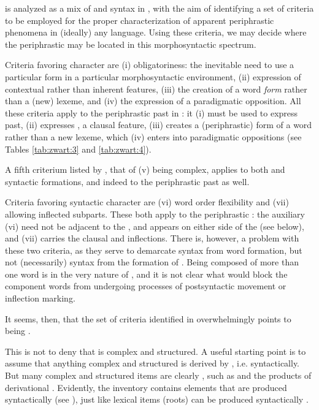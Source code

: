 \documentclass[output=paper]{LSP/langsci}
\begin{document}
 is analyzed as a mix of  and syntax in \citet{BrownEtAl2012}, with the aim of identifying a set of criteria to be employed for the proper characterization of apparent periphrastic phenomena in (ideally) any language. Using these criteria, we may decide where the  periphrastic  may be located in this morphosyntactic spectrum.

Criteria favoring  character are (i) obligatoriness: the inevitable need to use a particular form in a particular morphosyntactic environment, (ii) expression of contextual rather than inherent features, (iii) the creation of a word \textit{form }rather than a (new) lexeme, and (iv) the expression of a paradigmatic opposition. All these criteria apply to the periphrastic past  in : it (i) must be used to express  past, (ii) expresses , a clausal feature, (iii) creates a (periphrastic) form of a word rather than a new lexeme, which (iv) enters into paradigmatic oppositions (see Tables \ref{tab:zwart:3} and \ref{tab:zwart:4}).

A fifth criterium listed by \citet{BrownEtAl2012}, that of (v) being complex, applies to both  and syntactic formations, and indeed to the  periphrastic past as well.

Criteria favoring syntactic character are (vi) word order flexibility and (vii) allowing inflected subparts. These both apply to the  periphrastic : the auxiliary (vi) need not be adjacent to the , and appears on either side of the  (see below), and (vii) carries the clausal  and  inflections. There is, however, a problem with these two criteria, as they serve to demarcate syntax from word formation, but not (necessarily) syntax from the formation of . Being composed of more than one word is in the very nature of , and it is not clear what would block the component words from undergoing processes of postsyntactic movement or inflection marking.

It seems, then, that the set of criteria identified in \citet{BrownEtAl2012} overwhelmingly points to  being . 

This is not to deny that  is complex and structured. A useful starting point is to assume that anything complex and structured is derived by , i.e. syntactically. But many complex and structured  items are clearly , such as  and the products of derivational . Evidently, the  inventory contains elements that are produced syntactically (see \citealt{AckemaNeeleman2004}), just like lexical items (roots) can be produced syntactically \citep{HaleKeyser2002}. 
\end{document}
